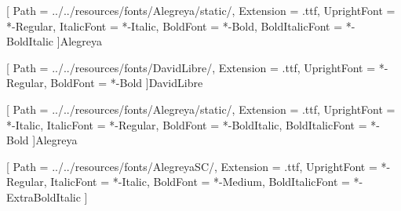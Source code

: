 \usepackage[hyperfootnotes=false,unicode,linktoc=all]{hyperref}

\usepackage[bidi=default]{babel}
[
    Path           = ../../resources/fonts/Alegreya/static/,
    Extension      = .ttf,
    UprightFont    = *-Regular,
    ItalicFont     = *-Italic,
    BoldFont       = *-Bold,
    BoldItalicFont = *-BoldItalic
]{Alegreya}

[
    Path           = ../../resources/fonts/DavidLibre/,
    Extension      = .ttf,
    UprightFont    = *-Regular,
    BoldFont       = *-Bold
]{DavidLibre}

[
    Path           = ../../resources/fonts/Alegreya/static/,
    Extension      = .ttf,
    UprightFont    = *-Italic,
    ItalicFont     = *-Regular,
    BoldFont       = *-BoldItalic,
    BoldItalicFont = *-Bold
]{Alegreya}

[
    Path           = ../../resources/fonts/AlegreyaSC/,
    Extension      = .ttf,
    UprightFont    = *-Regular,
    ItalicFont     = *-Italic,
    BoldFont       = *-Medium,
    BoldItalicFont = *-ExtraBoldItalic
]

\setmonofont[
    Path           = ../../resources/fonts/CascadiaMono/static/,
    Extension      = .ttf,
    UprightFont    = *-SemiLight,
    ItalicFont     = *-SemiLightItalic,
    BoldFont       = *-Bold,
    BoldItalicFont = *-BoldItalic
]{CascadiaMono}


\renewcommand{\parttitlefont}{\headerfont\HUGE\bfseries\raggedleft}
\setsecheadstyle{\Large\bfseries\raggedright}
\renewcommand*{\chaptitlefont}{\headerfont\Huge\bfseries\centering}

\setlength{\beforechapskip}{40pt}


